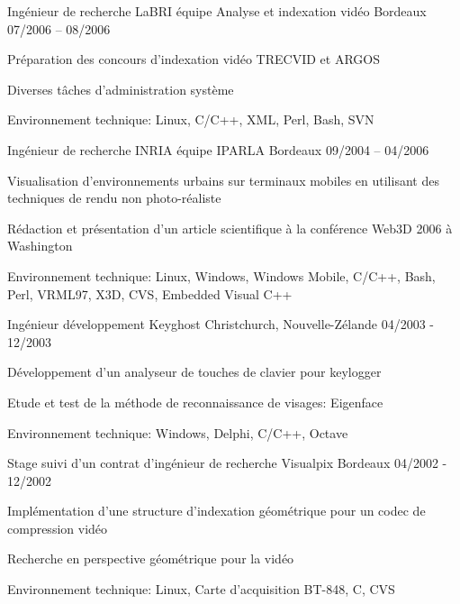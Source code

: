 \begin{cventries}
  \cventry
    {Ingénieur de recherche}
    {LaBRI équipe Analyse et indexation vidéo}
    {Bordeaux}
    {07/2006 – 08/2006}
    {
      \begin{cvitems}
        \item {Préparation des concours d'indexation vidéo TRECVID et ARGOS}
        \item {Diverses tâches d'administration système}
        \item {Environnement technique: Linux, C/C++, XML, Perl, Bash, SVN}
      \end{cvitems}
    }

  \cventry
    {Ingénieur de recherche}
    {INRIA équipe IPARLA}
    {Bordeaux}
    {09/2004 – 04/2006}
    {
      \begin{cvitems}
        \item {Visualisation d'environnements urbains sur terminaux mobiles en utilisant des techniques de
rendu non photo-réaliste}
        \item {Rédaction et présentation d'un article scientifique à la conférence Web3D 2006 à Washington}
        \item {Environnement technique: Linux, Windows, Windows Mobile, C/C++, Bash, Perl, VRML97, X3D, CVS, Embedded Visual C++}
      \end{cvitems}
    }

  \cventry
    {Ingénieur développement}
    {Keyghost}
    {Christchurch, Nouvelle-Zélande}
    {04/2003 - 12/2003}
    {
      \begin{cvitems}
        \item {Développement d'un analyseur de touches de clavier pour keylogger}
        \item {Etude et test de la méthode de reconnaissance de visages: Eigenface}
		\item {Environnement technique: Windows, Delphi, C/C++, Octave}
      \end{cvitems}
    }

  \cventry
    {Stage suivi d'un contrat d'ingénieur de recherche}
    {Visualpix}
    {Bordeaux}
    {04/2002 - 12/2002}
    {
      \begin{cvitems}
        \item {Implémentation d'une structure d'indexation géométrique pour un codec de compression vidéo}
		\item {Recherche en perspective géométrique pour la vidéo}
		\item {Environnement technique: Linux, Carte d'acquisition BT-848, C, CVS}
      \end{cvitems}
    }


\end{cventries}
